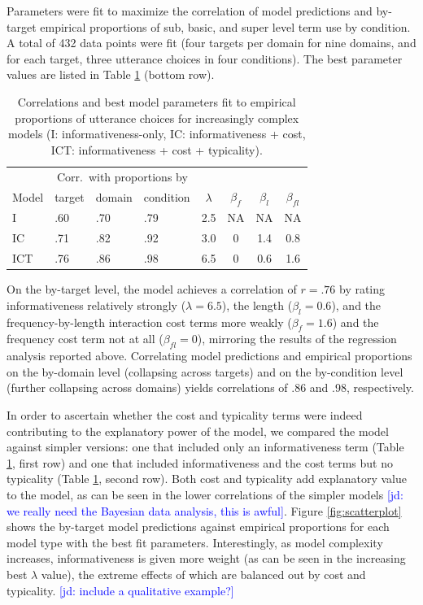 \documentclass[10pt,letterpaper]{article}
\newcommand{\jd}[1]{\textcolor{Blue}{[jd: #1]}}
\newcommand{\tableref}[1]{Table \ref{#1}}
\newcommand{\figref}[1]{Figure \ref{#1}}
\begin{document}
Parameters were fit to maximize the correlation of model predictions and by-target empirical proportions of sub, basic, and super level term use by condition. A total of 432 data points were fit (four targets per domain for nine domains, and for each target, three utterance choices in four conditions). The best parameter values are listed in \tableref{tab:bestparams} (bottom row). 

\begin{table}
\caption{Correlations and best model parameters fit to empirical proportions of utterance choices for increasingly complex models (I: informativeness-only, IC: informativeness + cost, ICT: informativeness + cost + typicality).}
\begin{center}
	\begin{tabular}{p{.7cm} p{.6cm} p{.8cm} p{.9cm} c c c c}
	\toprule
	& \multicolumn{3}{c}{Corr.~with proportions by} & &  \\
	Model & target & domain & condition & $\lambda$ & $\beta_f$ & $\beta_l$ & $\beta_{fl}$\\
	\midrule
	I & .60 & .70 & .79 & 2.5 & NA & NA & NA\\
	IC  & .71 & .82 & .92 & 3.0 & 0 & 1.4 & 0.8  \\
	ICT  & .76 & .86 & .98 & 6.5 & 0 & 0.6 & 1.6   \\
	\bottomrule
	\end{tabular}	
\end{center}
\label{tab:bestparams}
\end{table}

On the by-target level, the model achieves a correlation of $r = .76$ by rating informativeness relatively strongly ($\lambda = 6.5$), the length  ($\beta_l = 0.6$), and the frequency-by-length interaction  cost terms more weakly ($\beta_f = 1.6$)  and the frequency cost term not at all ($\beta_{fl} = 0$), mirroring the results of the regression analysis reported above. Correlating model predictions and empirical proportions on the by-domain level (collapsing across targets) and on the by-condition level (further collapsing across domains) yields correlations of .86 and .98, respectively.

In order to ascertain whether the cost and typicality terms were indeed contributing to the explanatory power of the model, we compared the model against simpler versions: one that included only an informativeness term (\tableref{tab:bestparams}, first row) and one that included informativeness and the cost terms but no typicality (\tableref{tab:bestparams}, second row). Both cost and typicality add explanatory value to the model, as can be seen in the lower correlations of the simpler models \jd{we really need the Bayesian data analysis, this is awful}. \figref{fig:scatterplot} shows the by-target model predictions against empirical proportions for each model type with the best fit parameters. Interestingly, as model complexity increases, informativeness is given more weight (as can be seen in the increasing best $\lambda$ value), the extreme effects of which are balanced out by cost and typicality. \jd{include a qualitative example?}
\end{document}
